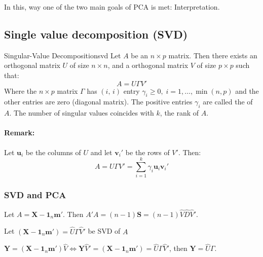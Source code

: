 \begin{note}
	In this, way one of the two main goals of PCA is met: Interpretation.
\end{note}

\subsection{Single value decomposition (SVD)}

\begin{theorem}{Singular-Value Decomposition}{svd}
	Let $A$ be an $n \times p$ matrix. Then there exists an orthogonal matrix $U$ of size $n \times n$,
	and a orthogonal matrix $V$ of size $p \times p$ such that:
	\begin{equation*}
		A = U \Gamma V'
	\end{equation*}
	Where the $n \times p$ matrix $\Gamma$ has $(i,\, i)$ entry $\gamma_i \geq 0,\;i=1,\ldots,\min(n,p)$
	and the other entries are zero (diagonal matrix). The positive entries $\gamma_i$ are called
	the  of $A$. The number of singular values coincides with $k$, the rank of $A$.
	\tcblower
	\paragraph{Remark:} Let $\boldsymbol{u}_i$ be the columns of $U$ and let $\boldsymbol{v}_i'$ be the
	rows of $V'$. Then:
	\begin{equation*}
		A = U \Gamma V' = \sum_{i=1}^k \gamma_i \boldsymbol{u}_i \boldsymbol{v}_i'
	\end{equation*}
\end{theorem}

\subsubsection{SVD and PCA}

Let $A = \boldsymbol{X} - \boldsymbol 1_n \boldsymbol m '$. Then $A'A = (n - 1) \boldsymbol{S} =
	(n - 1) \hat{V} \hat{D} \hat{V}'$.

Let $(\boldsymbol X - \boldsymbol 1_n \boldsymbol m ') = \hat{U}\Gamma \hat{V}'$ be SVD of $A$

$\boldsymbol{Y} = (\boldsymbol X - \boldsymbol 1_n \boldsymbol m ') \hat{V} \iff
	\boldsymbol Y \hat{V}' = (\boldsymbol X - \boldsymbol 1_n \boldsymbol m ') = \hat{U}\Gamma\hat{V}'$,
then $\boldsymbol{Y} = \hat{U}\Gamma$.

